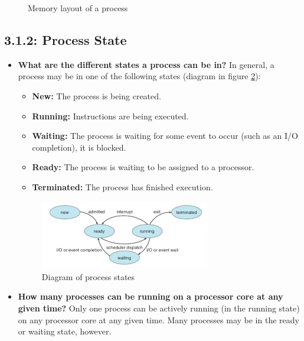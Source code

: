 \documentclass[12pt]{article}
\begin{document}
\begin{itemize}
\begin{figure}[ht]
            \caption{Memory layout of a process}
            \label{fig:process-memory-layout}
        \end{figure}
\end{itemize}

\subsection*{3.1.2: Process State}

\begin{itemize}
    \item \textbf{What are the different states a process can be in?} In general, a process may be in one of the following states (diagram in figure \ref{fig:process-states}):
    \begin{itemize}
        \item \textbf{New:} The process is being created.
        \item \textbf{Running:} Instructions are being executed.
        \item \textbf{Waiting:} The process is waiting for some event to occur (such as an I/O completion), it is blocked.
        \item \textbf{Ready:} The process is waiting to be assigned to a processor.
        \item \textbf{Terminated:} The process has finished execution.
    \end{itemize}
    \begin{figure}[ht]
        \centering
        \includegraphics[width=0.7\textwidth]{figures/process-states.jpg}
        \caption{Diagram of process states}
        \label{fig:process-states}
    \end{figure}
\item \textbf{How many processes can be running on a processor core at any given time?} Only one process can be actively running (in the running state) on any processor core at any given time. Many processes may be in the ready or waiting state, however.
\end{itemize}
\end{document}
